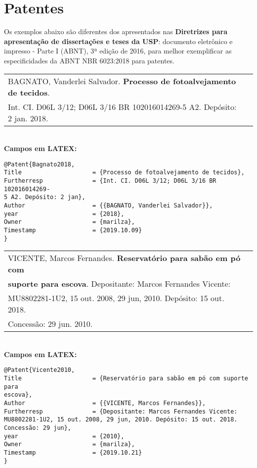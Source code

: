 \section{Patentes}

Os exemplos abaixo são diferentes dos apresentados nas \textbf{Diretrizes para apresentação de dissertações e teses da USP}: documento eletrônico e impresso - Parte I (ABNT), 3ª edição de 2016, para melhor exemplificar as especificidades da ABNT NBR 6023:2018 para patentes. \\

\begin{tabular}{|l|c|} \hline
	BAGNATO, Vanderlei Salvador. \textbf{Processo de fotoalvejamento de tecidos}. \\ 
	Int. CI. D06L 3/12; D06L 3/16 BR 102016014269-5 A2. Depósito: 2 jan. 2018.
	\\\hline
\end{tabular} \\

\textbf{Campos em LATEX:} 

\begin{verbatim}
@Patent{Bagnato2018,
Title                    = {Processo de fotoalvejamento de tecidos},
Furtherresp              = {Int. CI. D06L 3/12; D06L 3/16 BR 102016014269-
5 A2. Depósito: 2 jan},
Author                   = {{BAGNATO, Vanderlei Salvador}},
year                     = {2018},
Owner                    = {marilza},
Timestamp                = {2019.10.09}
}
\end{verbatim}



\begin{tabular}{|l|c|} \hline
	VICENTE, Marcos Fernandes. \textbf{Reservatório para sabão em pó com} \\ 
	\textbf{suporte para escova}. Depositante: Marcos Fernandes Vicente: \\
	MU8802281-1U2, 15 out. 2008, 29 jun, 2010. Depósito: 15 out. 2018. \\
	Concessão: 29 jun. 2010.
	\\\hline
\end{tabular} \\


\textbf{Campos em LATEX:} 

\begin{verbatim}
@Patent{Vicente2010,
Title                    = {Reservatório para sabão em pó com suporte para 
escova},
Author                   = {{VICENTE, Marcos Fernandes}},
Furtherresp              = {Depositante: Marcos Fernandes Vicente: 
MU8802281-1U2, 15 out. 2008, 29 jun, 2010. Depósito: 15 out. 2018. 
Concessão: 29 jun},
year                     = {2010},
Owner                    = {marilza},
Timestamp                = {2019.10.21}
}
\end{verbatim}

